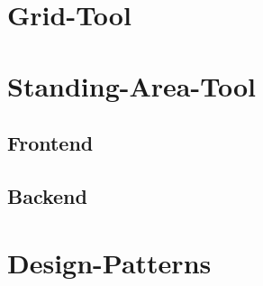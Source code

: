 \section{Grid-Tool}

\section{Standing-Area-Tool}

\subsection{Frontend}

\subsection{Backend}

\section{Design-Patterns}
